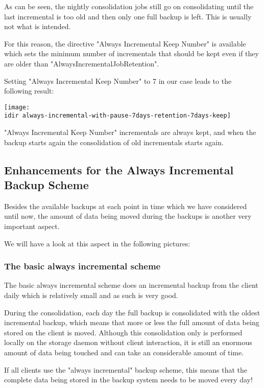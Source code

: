 As can be seen, the nightly consolidation jobs still go on consolidating until the last incremental is too old and then only one full backup is left. This is usually not what is intended.

For this reason, the directive "Always Incremental Keep Number" is available which sets the minimum number of incrementals that should be kept even if they are older than "AlwaysIncrementalJobRetention".

Setting "Always Incremental Keep Number" to 7 in our case leads to the following result:

\begin{center}
\texttt{[image: \\idir always-incremental-with-pause-7days-retention-7days-keep]}
\end{center}

"Always Incremental Keep Number"  incrementals are always kept, and when the backup starts again the consolidation of old incrementals starts again.


\subsection{Enhancements for the Always Incremental Backup Scheme}

Besides the available backups at each point in time which we have considered until now, the amount of data being moved during the backups is another very important aspect.

We will have a look at this aspect in the following pictures:


\subsubsection{The basic always incremental scheme}

The basic always incremental scheme does an incremental backup from the client daily which is relatively small and as such is very good.

During the consolidation, each day the full backup is consolidated with the oldest incremental backup, which means that more or less the full amount of data being stored on the client is moved. 
Although this consolidation only is performed locally on the storage daemon without client interaction, it is still an enormous amount of data being touched and can take an considerable amount of time.

If all clients use the "always incremental" backup scheme, this means that the complete data being stored in the backup system needs to be moved every day!

